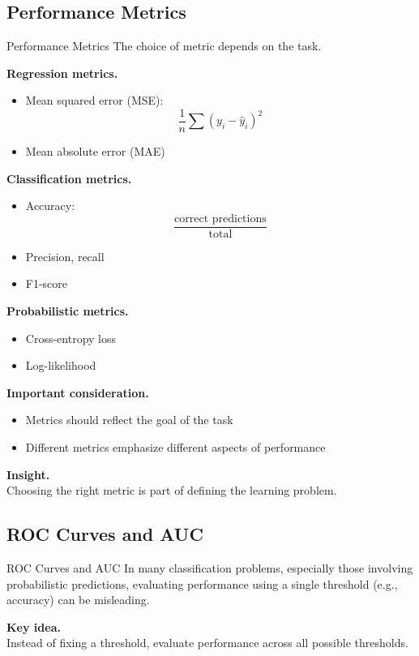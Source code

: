 \documentclass[aspectratio=169,11pt]{beamer}
\begin{document}
\subsection{Performance Metrics}
\begin{frame}[t,allowframebreaks]{Performance Metrics}
\small
The choice of metric depends on the task.

\textbf{Regression metrics.}\\ \begin{itemize}
    \item Mean squared error (MSE):
    \[
    \frac{1}{n} \sum (y_i - \hat{y}_i)^2
    \]
    \item Mean absolute error (MAE)
\end{itemize}

\textbf{Classification metrics.}\\ \begin{itemize}
    \item Accuracy:
    \[
    \frac{\text{correct predictions}}{\text{total}}
    \]
    \item Precision, recall
    \item F1-score
\end{itemize}

\textbf{Probabilistic metrics.}\\ \begin{itemize}
    \item Cross-entropy loss
    \item Log-likelihood
\end{itemize}

\textbf{Important consideration.}\\ \begin{itemize}
    \item Metrics should reflect the goal of the task
    \item Different metrics emphasize different aspects of performance
\end{itemize}

\textbf{Insight.}\\ Choosing the right metric is part of defining the learning problem.
\end{frame}

\subsection{ROC Curves and AUC}
\begin{frame}[t,allowframebreaks]{ROC Curves and AUC}
\small
In many classification problems, especially those involving probabilistic predictions, evaluating performance using a single threshold (e.g., accuracy) can be misleading.

\textbf{Key idea.}\\ Instead of fixing a threshold, evaluate performance across all possible thresholds.
\end{frame}
\end{document}
